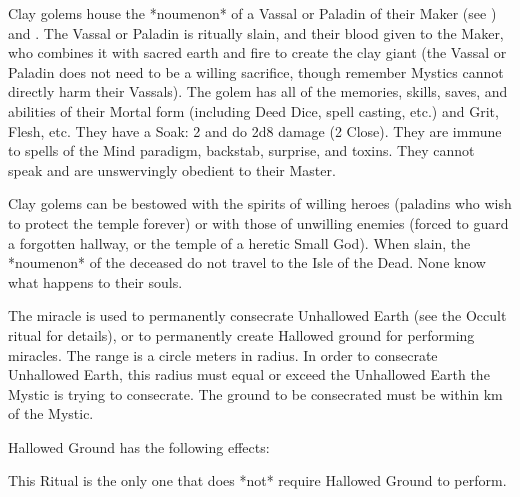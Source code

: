 {Clay golems house the *noumenon* of a Vassal or Paladin of their Maker (see ) and .  The Vassal or Paladin is ritually slain, and their blood given to the Maker, who combines it with sacred earth and fire to create the clay giant (the Vassal or Paladin does not need to be a willing sacrifice, though remember Mystics cannot directly harm their Vassals).  The golem has all of the memories, skills, saves, and abilities of their Mortal form (including Deed Dice, spell casting, etc.) and Grit, Flesh, etc.  They have a Soak: 2 and do 2d8 damage (2 Close).  They are immune to spells of the Mind paradigm, backstab, surprise, and toxins. They cannot speak and are unswervingly obedient to their Master.

Clay golems can be bestowed with the spirits of willing heroes (paladins who wish to protect the temple forever) or with those of unwilling enemies (forced to guard a forgotten hallway, or the temple of a heretic Small God).  When slain, the *noumenon* of the deceased do not travel to the Isle of the Dead.  None know what happens to their souls. 



The miracle is used to permanently consecrate Unhallowed Earth (see the Occult ritual for details), or to permanently create Hallowed ground for performing miracles.  The range is a circle \DICE meters in radius.  In order to consecrate Unhallowed Earth, this radius must equal or exceed the Unhallowed Earth the Mystic is trying to consecrate.  The ground to be consecrated must be within \DICE km of the Mystic.



Hallowed Ground has the following effects:


This Ritual is the only one that does *not* require Hallowed Ground to perform.



}
